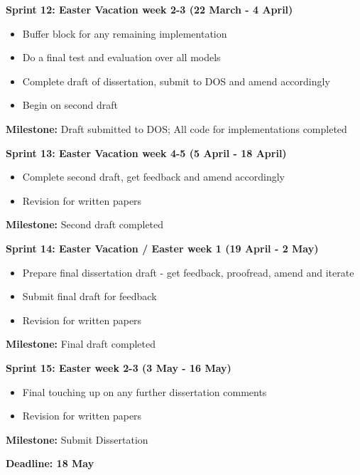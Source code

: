 \documentclass[12pt,a4paper,twoside]{article}
\begin{document}
\noindent\textbf{Sprint 12: Easter Vacation week 2-3 (22 March - 4 April)}
\begin{addmargin}[3em]{0em}
	\begin{itemize}
		\setlength\itemsep{0em}
		\item Buffer block for any remaining implementation
		\item Do a final test and evaluation over all models
		\item Complete draft of dissertation, submit to DOS and amend accordingly
		\item Begin on second draft
	\end{itemize}
	\noindent\textbf{Milestone:} Draft submitted to DOS; All code for implementations completed
	\setlength{\parskip}{1em}
\end{addmargin}

\noindent\textbf{Sprint 13: Easter Vacation week 4-5 (5 April - 18 April)}
\begin{addmargin}[3em]{0em}
	\begin{itemize}
		\setlength\itemsep{0em}
		\item Complete second draft, get feedback and amend accordingly
		\item Revision for written papers
	\end{itemize}
	\noindent\textbf{Milestone:} Second draft completed
	\setlength{\parskip}{1em}
\end{addmargin}

\noindent\textbf{Sprint 14: Easter Vacation / Easter week 1 (19 April - 2 May)}
\begin{addmargin}[3em]{0em}
	\begin{itemize}
		\setlength\itemsep{0em}
		\item Prepare final dissertation draft - get feedback, proofread, amend and iterate
		\item Submit final draft for feedback
		\item Revision for written papers
	\end{itemize}
	\noindent\textbf{Milestone:} Final draft completed
	\setlength{\parskip}{1em}
\end{addmargin}

\noindent\textbf{Sprint 15: Easter week 2-3 (3 May - 16 May)}
\begin{addmargin}[3em]{0em}
	\begin{itemize}
		\setlength\itemsep{0em}
		\item Final touching up on any further dissertation comments 
		\item Revision for written papers
	\end{itemize}
	\noindent\textbf{Milestone:} Submit Dissertation
	\setlength{\parskip}{1em}
\end{addmargin}

\setlength{\parskip}{1em}
\noindent\textbf{Deadline: 18 May}
\vspace{1em}

\newpage




 
 

\end{document}
